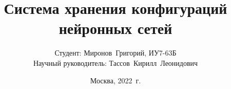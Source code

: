 \title{\LARGE Система хранения конфигураций нейронных сетей}
\subtitle{\hfill Студент: Миронов~Григорий, ИУ7-63Б
 \\\hfill Научный руководитель: Тассов~Кирилл~Леонидович}
\date{Москва, 2022~г.}

\frame {
	\titlepage
}
